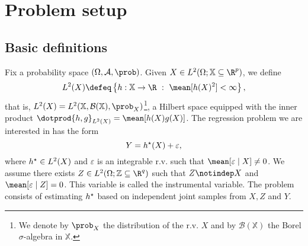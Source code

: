 \section{Problem setup}

\subsection{Basic definitions}

Fix a probability space $ ( \Omega, \mathcal{A}, \prob ) $.
Given $ X \in L^{ 2 } ( \Omega ; \mathbb{X} \subseteq \R^{ p } ) $, we define
\begin{equation*}
    L^{ 2 } ( X ) \defeq \left\{ h : \mathbb{X} \to \R \ : \ \mean [ h ( X )^2 ] < \infty \right\}
,\end{equation*}
that is, $ L^{ 2 } ( X ) = L^{ 2 } ( \mathbb{X}, \mathcal{B} ( \mathbb{X} ), \prob_{ X } ) $\footnote{We denote by $ \prob_{ X } $ the distribution of the r.v. $ X $ and by $ \mathcal{B} ( \mathbb{X} ) $ the Borel $ \sigma $-algebra in $ \mathbb{X} $.}, a Hilbert space equipped with the inner product $ \dotprod{ h, g }_{ L^{ 2 } ( X ) } = \mean [ h ( X ) g ( X ) ] $.
The regression problem we are interested in has the form
\begin{equation}
    \label{eq: main problem}
    Y = h^{ \star } (X) + \varepsilon
,\end{equation}
where $ h^{ \star } \in L^{ 2 } ( X ) $ and $ \varepsilon $ is an integrable r.v. such that $ \mean [ \varepsilon \mid X ] \neq 0 $.
We assume there exists $ Z \in L^{ 2 } ( \Omega ; \mathbb{Z} \subseteq \R^{ q } ) $ such that $ Z \notindep X $ and $ \mean [ \varepsilon \mid Z ] = 0 $.
This variable is called the instrumental variable.
The problem consists of estimating $ h^{ \star } $ based on independent joint samples from $ X, Z $ and $ Y $.

